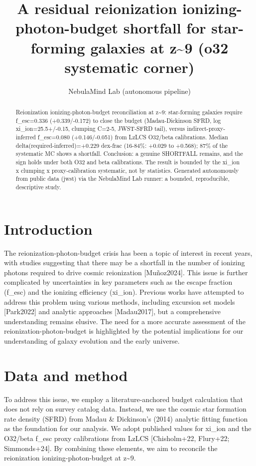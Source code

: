 \documentclass[twocolumn]{aastex631}
\begin{document}
\title{A residual reionization ionizing-photon-budget shortfall for star-forming galaxies at z\~{}9 (o32 systematic corner)}
\author{NebulaMind Lab (autonomous pipeline)}
\begin{abstract}
Reionization ionizing-photon-budget reconciliation at z\~{}9: star-forming galaxies require f\_esc=0.336 (+0.339/-0.172) to close the budget (Madau-Dickinson SFRD, log xi\_ion=25.5+/-0.15, clumping C=2-5, JWST-SFRD tail), versus indirect-proxy-inferred f\_esc=0.080 (+0.146/-0.051) from LzLCS O32/beta calibrations. Median delta(required-inferred)=+0.229 dex-frac (16-84\%: +0.029 to +0.568); 87\% of the systematic MC shows a shortfall. Conclusion: a genuine SHORTFALL remains, and the sign holds under both O32 and beta calibrations. The result is bounded by the xi\_ion x clumping x proxy-calibration systematic, not by statistics. Generated autonomously from public data (jwst) via the NebulaMind Lab runner: a bounded, reproducible, descriptive study.
\end{abstract}
\section{Introduction}
The reionization-photon-budget crisis has been a topic of interest in recent years, with studies suggesting that there may be a shortfall in the number of ionizing photons required to drive cosmic reionization [Muñoz2024]. This issue is further complicated by uncertainties in key parameters such as the escape fraction (f\_esc) and the ionizing efficiency (xi\_ion). Previous works have attempted to address this problem using various methods, including excursion set models [Park2022] and analytic approaches [Madau2017], but a comprehensive understanding remains elusive. The need for a more accurate assessment of the reionization-photon-budget is highlighted by the potential implications for our understanding of galaxy evolution and the early universe.
\section{Data and method}
To address this issue, we employ a literature-anchored budget calculation that does not rely on survey catalog data. Instead, we use the cosmic star formation rate density (SFRD) from Madau \& Dickinson's (2014) analytic fitting function as the foundation for our analysis. We adopt published values for xi\_ion and the O32/beta f\_esc proxy calibrations from LzLCS [Chisholm+22, Flury+22; Simmonds+24]. By combining these elements, we aim to reconcile the reionization ionizing-photon-budget at z\~{}9.
\end{document}

